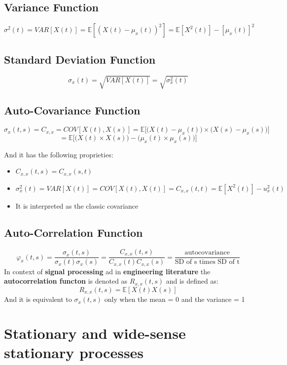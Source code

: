 \subsection{Variance Function}
\[\sigma^2(t) = VAR[X(t)] = \mathbb{E}[(X(t) - \mu_x(t))^2] = \mathbb{E}[X^2(t)] - [\mu_x(t)]^2\]

\subsection{Standard Deviation Function}
\[\sigma_x(t) = \sqrt{VAR[X(t)]} = \sqrt{\sigma_x^2(t)}\]

\subsection{Auto-Covariance Function}
\[\sigma_x(t,s) = C_{x,x} = COV[X(t), X(s)] = \mathbb{E}\Big[\Big(X(t) - \mu_x(t)\Big) \times \Big(X(s) - \mu_x(s)\Big)\Big]\]
\[ = \mathbb{E}\Big[\Big(X(t) \times X(s)\Big) - \Big(\mu_x(t) \times \mu_x(s)\Big)\Big]\]

And it has the following proprieties:
\begin{itemize}
    \item \(C_{x,x}(t,s) = C_{x,x}(s,t)\)
    \item \(\sigma^2_x(t) = VAR[X(t)] = COV[X(t),X(t)] = C_{x,x}(t,t) = \mathbb{E}[X^2(t)] - u^2_x(t)\)
    \item It is interpreted as the classic covariance
\end{itemize}

\subsection{Auto-Correlation Function}
\[\varphi_x(t,s) = \frac{\sigma_x(t,s)}{\sigma_x(t)\sigma_x(s)} = \frac{C_{x,x}(t,s)}{C_{x,x}(t)C_{x,x}(s)} = \frac{\text{autocovariance}}{\text{SD of s times SD of t}}\]
In context of \textbf{signal processing} ad in \textbf{engineering literature} the \textbf{autocorrelation functon} is denoted as \(R_{x,x}(t,s)\) and is defined as:
\[R_{x,x}(t,s) = \mathbb{E}[X(t)X(s)]\]
And it is equivalent to \(\sigma_x(t,s)\) only when the mean = 0 and the variance = 1

\section{Stationary and wide-sense stationary processes}
